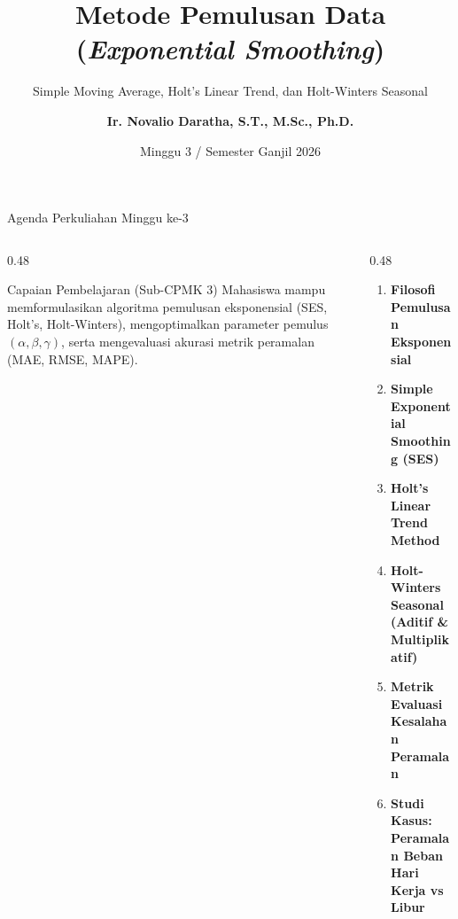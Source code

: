 \documentclass[aspectratio=169, 10pt]{beamer}
\title[\textbf{Deret Waktu (Minggu 3)}]{\textbf{Metode Pemulusan Data (\textit{Exponential Smoothing})}}
\subtitle{Simple Moving Average, Holt's Linear Trend, dan Holt-Winters Seasonal}
\author[\textbf{Ir. Novalio Daratha, Ph.D.}]{\textbf{Ir. Novalio Daratha, S.T., M.Sc., Ph.D.}}
\institute[FT UNIB]{Program Studi Teknik Elektro -- Fakultas Teknik\\Universitas Bengkulu}
\date{Minggu 3 / Semester Ganjil 2026}
\begin{document}
\begin{frame}[plain]
    \titlepage
\end{frame}

\begin{frame}{Agenda Perkuliahan Minggu ke-3}
    \begin{columns}[T]
        \begin{column}{0.48\textwidth}
            \begin{block}{Capaian Pembelajaran (Sub-CPMK 3)}
                Mahasiswa mampu memformulasikan algoritma pemulusan eksponensial (SES, Holt's, Holt-Winters), mengoptimalkan parameter pemulus $(\alpha, \beta, \gamma)$, serta mengevaluasi akurasi metrik peramalan (MAE, RMSE, MAPE).
            \end{block}
        \end{column}
        \begin{column}{0.48\textwidth}
            \begin{enumerate}
                \item \textbf{Filosofi Pemulusan Eksponensial}
                \item \textbf{Simple Exponential Smoothing (SES)}
                \item \textbf{Holt's Linear Trend Method}
                \item \textbf{Holt-Winters Seasonal (Aditif \& Multiplikatif)}
                \item \textbf{Metrik Evaluasi Kesalahan Peramalan}
                \item \textbf{Studi Kasus: Peramalan Beban Hari Kerja vs Libur}
            \end{enumerate}
        \end{column}
    \end{columns}
\end{frame}
\end{document}
